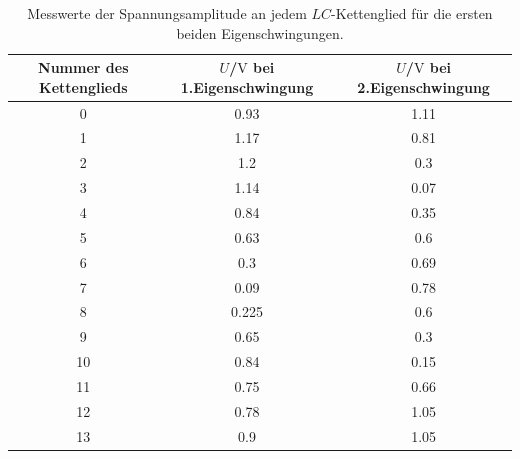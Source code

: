\begin{table}
	\centering
	\caption{Messwerte der Spannungsamplitude an jedem $LC$-Kettenglied für die ersten beiden Eigenschwingungen.}
	\label{tab:ei}
	\begin{tabular}{ccc}
		\toprule
		Nummer des Kettenglieds & $U$/$\si{\volt}$ bei 1.Eigenschwingung & $U$/$\si{\volt}$ bei 2.Eigenschwingung \\
		\midrule
		0                       & 0.93                                   & 1.11                                   \\
		1                       & 1.17                                   & 0.81                                   \\
		2                       & 1.2                                    & 0.3                                    \\
		3                       & 1.14                                   & 0.07                                   \\
		4                       & 0.84                                   & 0.35                                   \\
		5                       & 0.63                                   & 0.6                                    \\
		6                       & 0.3                                    & 0.69                                   \\
		7                       & 0.09                                   & 0.78                                   \\
		8                       & 0.225                                  & 0.6                                    \\
		9                       & 0.65                                   & 0.3                                    \\
		10                      & 0.84                                   & 0.15                                   \\
		11                      & 0.75                                   & 0.66                                   \\
		12                      & 0.78                                   & 1.05                                   \\
		13                      & 0.9                                    & 1.05                                   \\
		\bottomrule
	\end{tabular}
\end{table}

